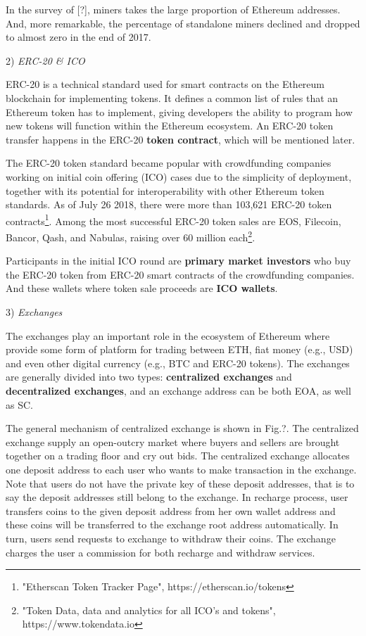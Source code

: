 In the survey of [?], miners takes the large proportion of Ethereum addresses. And, more remarkable, the percentage of standalone miners declined and dropped to almost zero in the end of 2017. 

2) \emph{ERC-20 \& ICO}

ERC-20 is a technical standard used for smart contracts on the Ethereum blockchain for implementing tokens\cite{erc-20-wiki}.  It defines a common list of rules that an Ethereum token has to implement, giving developers the ability to program how new tokens will function within the Ethereum ecosystem. An ERC-20 token transfer happens in the ERC-20 \textbf{token contract}, which will be mentioned later. 

The ERC-20 token standard became popular with crowdfunding companies working on initial coin offering (ICO) cases due to the simplicity of deployment, together with its potential for interoperability with other Ethereum token standards\cite{erc-20}. As of July 26 2018, there were more than 103,621 ERC-20 token contracts\footnote{"Etherscan Token Tracker Page", https://etherscan.io/tokens}. Among the most successful ERC-20 token sales are EOS, Filecoin, Bancor, Qash, and Nabulas, raising over 60 million each\footnote{"Token Data, data and analytics for all ICO's and tokens", https://www.tokendata.io}.

Participants in the initial ICO round are \textbf{primary market investors} who buy the ERC-20 token from ERC-20 smart contracts of the crowdfunding companies. And these wallets where token sale proceeds are \textbf{ICO wallets}.

3) \emph{Exchanges}

The exchanges play an important role in the ecosystem of Ethereum where provide some form of platform for trading between ETH, fiat money (e.g., USD) and even other digital currency (e.g., BTC and ERC-20 tokens). The exchanges are generally divided into two types: \textbf{centralized exchanges} and \textbf{decentralized exchanges}, and an exchange address can be both EOA, as well as SC. 

The general mechanism of centralized exchange is shown in Fig.?. The centralized exchange supply an open-outcry market where buyers and sellers are brought together on a trading floor and cry out bids. The centralized exchange allocates one deposit address to each user who wants to make transaction in the exchange. Note that users do not have the private key of these deposit addresses, that is to say the deposit addresses still belong to the exchange. In recharge process, user transfers coins to the given deposit address from her own wallet address and these coins will be transferred to the exchange root address automatically. In turn, users send requests to exchange to withdraw their coins. The exchange charges the user a commission for both recharge and withdraw services.

